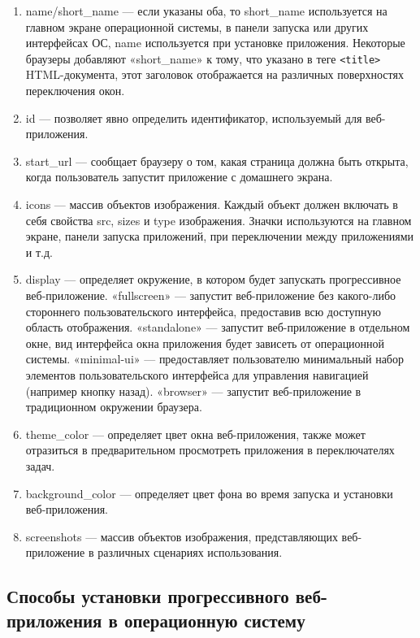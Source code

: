 \begin{enumerate} 
  \item name/short\_name — если указаны оба, то short\_name используется на главном экране операционной системы, в панели запуска или других интерфейсах ОС, name используется при установке приложения. Некоторые браузеры добавляют «short\_name» к тому, что указано в теге \verb|<title>| HTML-документа, этот заголовок отображается на различных поверхностях переключения окон.
  
  \item id — позволяет явно определить идентификатор, используемый для веб-приложения.

  \item start\_url — сообщает браузеру о том, какая страница должна быть открыта, когда пользователь запустит приложение с домашнего экрана.

  \item icons — массив объектов изображения. Каждый объект должен включать в себя свойства src, sizes и type изображения. Значки используются на главном экране, панели запуска приложений, при переключении между приложениями и т.д.

  \item display — определяет окружение, в котором будет запускать прогрессивное веб-приложение. «fullscreen» — запустит веб-приложение без какого-либо стороннего пользовательского интерфейса, предоставив всю доступную область отображения. «standalone» — запустит веб-приложение в отдельном окне, вид интерфейса окна приложения будет зависеть от операционной системы. «minimal-ui» — предоставляет пользователю минимальный набор элементов пользовательского интерфейса для управления навигацией (например кнопку назад). «browser» — запустит веб-приложение в традиционном окружении браузера.

  \item theme\_color — определяет цвет окна веб-приложения, также может отразиться в предварительном просмотреть приложения в переключателях задач.

  \item background\_color — определяет цвет фона во время запуска и установки веб-приложения.

  \item screenshots — массив объектов изображения, представляющих веб-приложение в различных сценариях использования.
\end{enumerate}

\subsection{Способы установки прогрессивного веб-приложения в операционную систему}


